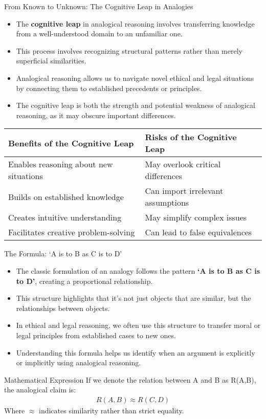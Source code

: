 \documentclass{beamer}
\begin{document}
	\begin{frame}{From Known to Unknown: The Cognitive Leap in Analogies}
		\begin{itemize}
			\item The \textbf{cognitive leap} in analogical reasoning involves transferring knowledge from a well-understood domain to an unfamiliar one.
			\item This process involves recognizing structural patterns rather than merely superficial similarities.
			\item Analogical reasoning allows us to navigate novel ethical and legal situations by connecting them to established precedents or principles.
			\item The cognitive leap is both the strength and potential weakness of analogical reasoning, as it may obscure important differences.
		\end{itemize}
		
		\begin{table}
			\scriptsize
			\begin{tabular}{|p{5cm}|p{5cm}|}
				\hline
				\textbf{Benefits of the Cognitive Leap} & \textbf{Risks of the Cognitive Leap} \\
				\hline
				Enables reasoning about new situations & May overlook critical differences \\
				Builds on established knowledge & Can import irrelevant assumptions \\
				Creates intuitive understanding & May simplify complex issues \\
				Facilitates creative problem-solving & Can lead to false equivalences \\
				\hline
			\end{tabular}
		\end{table}
	\end{frame}
	
	\begin{frame}{The Formula: `A is to B as C is to D'}
		\begin{itemize}
			\item The classic formulation of an analogy follows the pattern \textbf{`A is to B as C is to D'}, creating a proportional relationship.
			\item This structure highlights that it's not just objects that are similar, but the relationships between objects.
			\item In ethical and legal reasoning, we often use this structure to transfer moral or legal principles from established cases to new ones.
			\item Understanding this formula helps us identify when an argument is explicitly or implicitly using analogical reasoning.
		\end{itemize}
		
		\begin{block}{Mathematical Expression}
			If we denote the relation between A and B as R(A,B), the analogical claim is:
			\begin{align}
				R(A,B) \approx R(C,D)
			\end{align}
			Where $\approx$ indicates similarity rather than strict equality.
		\end{block}
	\end{frame}
	
\end{document}
